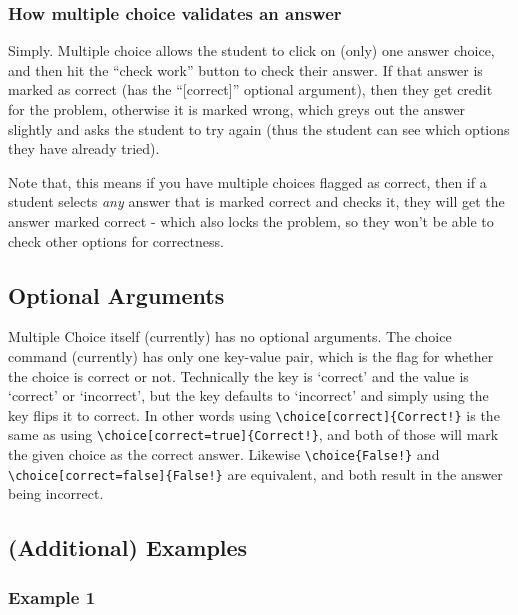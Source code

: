 \documentclass{ximera}
\begin{document}
            
        \subsubsection*{How multiple choice validates an answer}
        
            Simply. Multiple choice allows the student to click on (only) one answer choice, and then hit the ``check work'' button to check their answer. If that answer is marked as correct (has the ``[correct]'' optional argument), then they get credit for the problem, otherwise it is marked wrong, which greys out the answer slightly and asks the student to try again (thus the student can see which options they have already tried).
            
            Note that, this means if you have multiple choices flagged as correct, then if a student selects \textit{any} answer that is marked correct and checks it, they will get the answer marked correct - which also locks the problem, so they won't be able to check other options for correctness.
            
            
    
    \subsection*{Optional Arguments}
    
        Multiple Choice itself (currently) has no optional arguments. The choice command (currently) has only one key-value pair, which is the flag for whether the choice is correct or not. Technically the key is `correct' and the value is `correct' or `incorrect', but the key defaults to `incorrect' and simply using the key flips it to correct. In other words using \verb|\choice[correct]{Correct!}| is the same as using \verb|\choice[correct=true]{Correct!}|, and both of those will mark the given choice as the correct answer. Likewise \verb|\choice{False!}| and \verb|\choice[correct=false]{False!}| are equivalent, and both result in the answer being incorrect.
        
    \subsection*{(Additional) Examples}
    
        \subsubsection*{Example 1}
            
\end{document}

